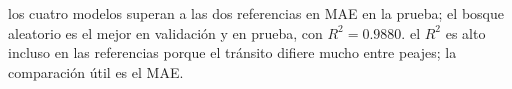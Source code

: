 {los cuatro modelos superan a las dos referencias en MAE en la prueba; el bosque aleatorio es el mejor en validación y en prueba, con $R^2 = 0.9880$.}
{el $R^2$ es alto incluso en las referencias porque el tránsito difiere mucho entre peajes; la comparación útil es el MAE.}
